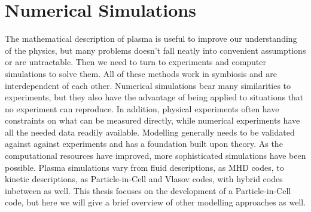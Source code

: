 \section{Numerical Simulations}

	The mathematical description of plasma is useful to improve our
	understanding of the physics, but many problems doesn't fall neatly into convenient
	assumptions or are untractable. Then we need to turn to experiments and computer simulations to
	solve them. All of these methods work in symbiosis and are interdependent
	of each other. Numerical simulations bear many similarities to
	experiments, but they also have the advantage of being applied to situations that no
	experiment can reproduce. In addition, physical experiments often have constraints on what can
 	be measured directly, while numerical experiments have all the needed data readily available.
	Modelling generally needs to be validated against
	against experiments and has a foundation built upon theory. As the computational
	resources have improved, more sophisticated simulations have been possible.
	Plasma simulations vary from fluid descriptions, as MHD codes, to kinetic descriptions,
	as Particle-in-Cell and Vlasov codes, with hybrid codes inbetween as well.
	This thesis focuses on the development of a Particle-in-Cell code, but here we will give a brief
	overview of other modelling approaches as well.

